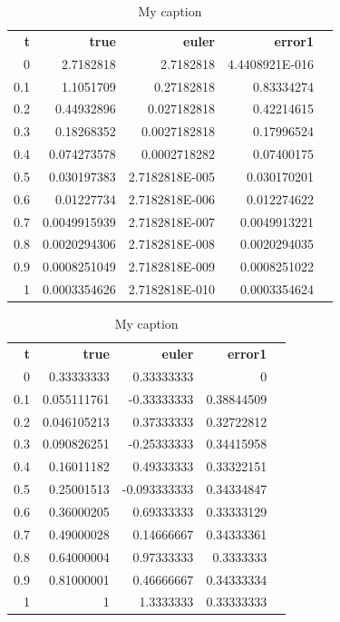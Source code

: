 \documentclass{article}
\begin{document}
\begin{table}[]
\centering
\caption{My caption}
\label{my-label}
\begin{tabular}{rrrrl}
\textbf{t} & \textbf{true} & \textbf{euler} & \textbf{error1} &  \\
0          & 2.7182818     & 2.7182818      & 4.4408921E-016  &  \\
0.1        & 1.1051709     & 0.27182818     & 0.83334274      &  \\
0.2        & 0.44932896    & 0.027182818    & 0.42214615      &  \\
0.3        & 0.18268352    & 0.0027182818   & 0.17996524      &  \\
0.4        & 0.074273578   & 0.0002718282   & 0.07400175      &  \\
0.5        & 0.030197383   & 2.7182818E-005 & 0.030170201     &  \\
0.6        & 0.01227734    & 2.7182818E-006 & 0.012274622     &  \\
0.7        & 0.0049915939  & 2.7182818E-007 & 0.0049913221    &  \\
0.8        & 0.0020294306  & 2.7182818E-008 & 0.0020294035    &  \\
0.9        & 0.0008251049  & 2.7182818E-009 & 0.0008251022    &  \\
1          & 0.0003354626  & 2.7182818E-010 & 0.0003354624    
\end{tabular}
\end{table}

\begin{table}[]
\centering
\caption{My caption}
\label{my-label}
\begin{tabular}{rrrrl}
\textbf{t} & \textbf{true} & \textbf{euler} & \textbf{error1} &  \\
0          & 0.33333333    & 0.33333333     & 0               &  \\
0.1        & 0.055111761   & -0.33333333    & 0.38844509      &  \\
0.2        & 0.046105213   & 0.37333333     & 0.32722812      &  \\
0.3        & 0.090826251   & -0.25333333    & 0.34415958      &  \\
0.4        & 0.16011182    & 0.49333333     & 0.33322151      &  \\
0.5        & 0.25001513    & -0.093333333   & 0.34334847      &  \\
0.6        & 0.36000205    & 0.69333333     & 0.33333129      &  \\
0.7        & 0.49000028    & 0.14666667     & 0.34333361      &  \\
0.8        & 0.64000004    & 0.97333333     & 0.3333333       &  \\
0.9        & 0.81000001    & 0.46666667     & 0.34333334      &  \\
1          & 1             & 1.3333333      & 0.33333333      & 
\end{tabular}
\end{table}
\end{document}
